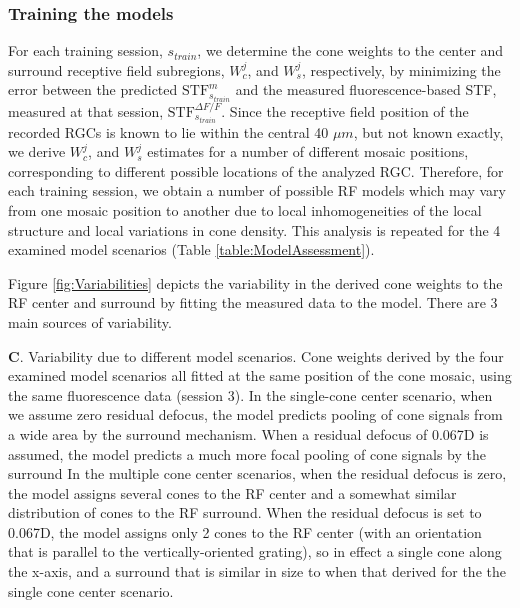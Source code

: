 \documentclass[11pt, oneside]{article}   	%
\begin{document}
\subsubsection{Training the models}
For each training session, $s_{train}$, we determine the cone weights to the center and surround receptive field subregions, $W_c^j$, and $W_s^j$, respectively, by minimizing the error between the predicted $\mbox{STF}^{m}_{s_{train}}$ and the measured fluorescence-based STF, measured at that session, $\mbox{STF}^{\Delta F / F}_{s_{train}}$. Since the receptive field position of the recorded RGCs is known to lie within the central 40 $\mu m$, but not known exactly, we derive $W_c^j$, and $W_s^j$ estimates for a number of different mosaic positions, corresponding to different possible locations of the analyzed RGC. Therefore, for each training session, we obtain a number of possible RF models which may vary from one mosaic position to another due to local inhomogeneities of the local structure and local variations in cone density. This analysis is repeated for the 4 examined model scenarios (Table \ref{table:ModelAssessment}).

Figure \ref{fig:Variabilities} depicts the variability in the derived cone weights to the RF center and surround by fitting the measured data to the model. There are 3 main sources of variability.

\textbf{C}. Variability due to different model scenarios. Cone weights derived by the four examined model scenarios all fitted at the same position of the cone mosaic, using the same fluorescence data (session 3). In the single-cone center scenario, when we assume zero residual defocus, the model predicts pooling of cone signals from a wide area by the surround mechanism. When a residual defocus of 0.067D is assumed, the model predicts a much more focal pooling of cone signals by the surround In the multiple cone center scenarios, when the residual defocus is zero, the model assigns several cones to the RF center and a somewhat similar distribution of cones to the RF surround. When the residual defocus is set to 0.067D, the model assigns only 2 cones to the RF center (with an orientation that is parallel to the vertically-oriented grating), so in effect a single cone along the x-axis, and a surround that is similar in size to when that derived for the the single cone center scenario. 
\end{document}
